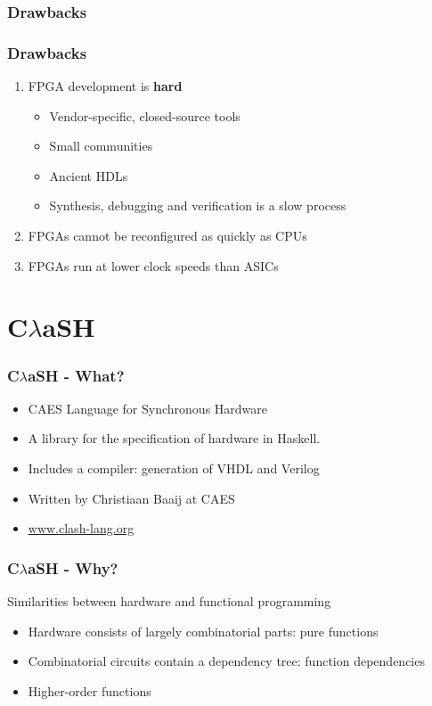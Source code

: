 \documentclass{beamer}[10]
\newcommand{\clash}{C$\lambda$aSH}
\begin{document}
\begin{frame}
	\frametitle{Drawbacks}
	
\end{frame}

\begin{frame}
	\frametitle{Drawbacks}
	
	\begin{enumerate} 
	\item FPGA development is \textbf{hard}
	
	\begin{itemize}
		\item Vendor-specific, closed-source tools
		\item Small communities
		\item Ancient HDLs
		\item Synthesis, debugging and verification is a slow process
	\end{itemize}
	
	\vspace{15pt}
	\item FPGAs cannot be reconfigured as quickly as CPUs
	
	\vspace{15pt}
	\item FPGAs run at lower clock speeds than ASICs
	\end{enumerate}
\end{frame}


\section{\clash{}}
\begin{frame}
	\frametitle{\clash{} - What?}
	\begin{itemize}
		\item CAES Language for Synchronous Hardware 
		\vspace{15pt}
		\item A library for the specification of hardware in Haskell. 
		\item Includes a compiler: generation of VHDL and Verilog
		\item Written by Christiaan Baaij at CAES
		\vspace{15pt}
		\item \href{http://www.clash-lang.org/}{www.clash-lang.org}
		\end{itemize}
\end{frame}

\begin{frame}
	\frametitle{\clash{} - Why?}
	Similarities between hardware and functional programming
	\begin{itemize}
		\item Hardware consists of largely combinatorial parts: pure functions
		\item Combinatorial circuits contain a dependency tree: function dependencies
		\item Higher-order functions
	\end{itemize}
\end{frame}
\end{document}
